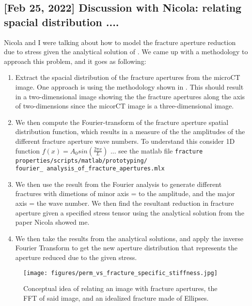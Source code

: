 \documentclass[12pt,titlepage]{article}
\begin{document}
\subsection{[Feb 25, 2022] Discussion with Nicola: relating spacial distribution .... }
Nicola and I were talking about how to model the fracture aperture reduction due to stress given the analytical solution of . We came up with a methodology to approach this problem, and it goes as following:
\begin{enumerate}
\item Extract the spacial distribution of the fracture apertures from the microCT image. One approach is using the methodology shown in \citep[see][fig. 5]{Zhao2018}. This should result in a two-dimensional image showing the the fracture apertures along the axis of two-dimensions since the micorCT image is a three-dimensional image.

\item We then compute the Fourier-transform of the fracture aperture spatial distribution function, which results in a measure of the the amplitudes of the different fracture aperture wave numbers. To understand this consider 1D function $f(x) = A_0 sin(\frac{2\pi x}{L})$ ... see the matlab file \texttt{fracture properties/scripts/matlab/prototyping/\\fourier\_ analysis\_of\_fracture\_apertures.mlx}

\item We then use the result from the Fourier analysis to generate different fractures with dimetions of minor axis = to the amplitude, and the major axis = the wave number. We then find the resultant reduction in fracture aperture given a specified stress tensor using the analytical solution from the paper Nicola showed me.

\item We then take the results from the analytical solutions, and apply the inverse Fourier Transform to get the new aperture distribution that represents the aperture reduced due to the given stress. 
\end{enumerate}

\begin{figure}[!ht]
\centering
\texttt{[image: figures/perm\_vs\_fracture\_specific\_stiffness.jpg]}
\caption{Conceptual idea of relating an image with fracture apertures, the FFT of said image, and an idealized fracture made of Ellipses.}
\label{fig:concept}
\end{figure}
\end{document}
